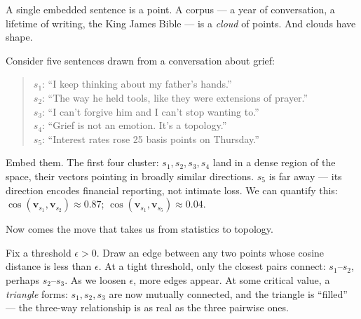 \documentclass[12pt,a4paper]{article}
\begin{document}
A single embedded sentence is a point. A corpus --- a year of conversation, a lifetime of writing, the King James Bible --- is a \emph{cloud} of points. And clouds have shape.

Consider five sentences drawn from a conversation about grief:

\begin{quote}
$s_1$: ``I keep thinking about my father's hands.''\\
$s_2$: ``The way he held tools, like they were extensions of prayer.''\\
$s_3$: ``I can't forgive him and I can't stop wanting to.''\\
$s_4$: ``Grief is not an emotion. It's a topology.''\\
$s_5$: ``Interest rates rose 25 basis points on Thursday.''
\end{quote}

Embed them. The first four cluster: $s_1, s_2, s_3, s_4$ land in a dense region of the space, their vectors pointing in broadly similar directions. $s_5$ is far away --- its direction encodes financial reporting, not intimate loss. We can quantify this: $\cos(\mathbf{v}_{s_1}, \mathbf{v}_{s_2}) \approx 0.87$; $\cos(\mathbf{v}_{s_1}, \mathbf{v}_{s_5}) \approx 0.04$.

Now comes the move that takes us from statistics to topology.

Fix a threshold $\epsilon > 0$. Draw an edge between any two points whose cosine distance is less than $\epsilon$. At a tight threshold, only the closest pairs connect: $s_1$--$s_2$, perhaps $s_2$--$s_3$. As we loosen $\epsilon$, more edges appear. At some critical value, a \emph{triangle} forms: $s_1, s_2, s_3$ are now mutually connected, and the triangle is ``filled'' --- the three-way relationship is as real as the three pairwise ones.
\end{document}
